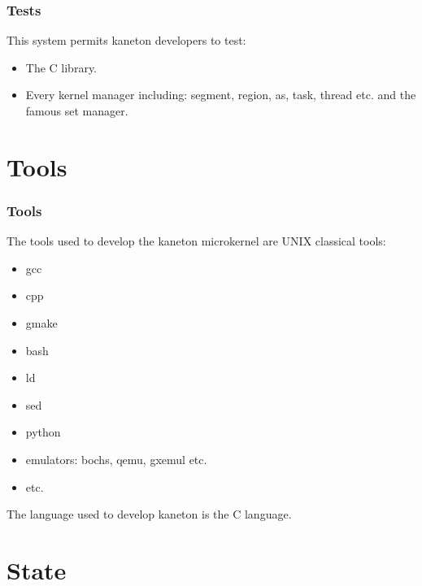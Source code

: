 
\begin{frame}
  \frametitle{Tests}

  This system permits kaneton developers to test:

  \begin{itemize}[<+->]
    \item
      The C library.
    \item
      Every kernel manager including: segment, region, as, task, thread
      etc. and the famous set manager.
  \end{itemize}
\end{frame}

%
%

\section{Tools}


\begin{frame}
  \frametitle{Tools}

  The tools used to develop the kaneton microkernel are UNIX classical tools:

  \begin{itemize}
    \item
      gcc
    \item
      cpp
    \item
      gmake
    \item
      bash
    \item
      ld
    \item
      sed
    \item
      python
    \item
      emulators: bochs, qemu, gxemul etc.
    \item
      etc.
  \end{itemize}

  \-

  The language used to develop kaneton is the C language.
\end{frame}

%
%

\section{State}


